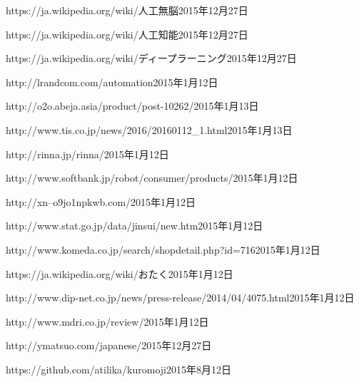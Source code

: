 \documentclass[a4paper,10pt,onecolumn,oneside,openany]{jsbook}
\begin{document}
\begin{thebibliography}{99}
	{https://ja.wikipedia.org/wiki/人工無脳}{2015年12月27日}

	{https://ja.wikipedia.org/wiki/人工知能}{2015年12月27日}

	{https://ja.wikipedia.org/wiki/ディープラーニング}{2015年12月27日}

	{http://lrandcom.com/automation}{2015年1月12日}

	{http://o2o.abeja.asia/product/post-10262/}{2015年1月13日}

	{http://www.tis.co.jp/news/2016/20160112_1.html}{2015年1月13日}

	{http://rinna.jp/rinna/}{2015年1月12日}

	{http://www.softbank.jp/robot/consumer/products/}{2015年1月12日}

	{http://xn--o9jo1npkwb.com/}{2015年1月12日}

	{http://www.stat.go.jp/data/jinsui/new.htm}{2015年1月12日}

	{http://www.komeda.co.jp/search/shopdetail.php?id=716}{2015年1月12日}

	{https://ja.wikipedia.org/wiki/おたく}{2015年1月12日}

	{http://www.dip-net.co.jp/news/press-release/2014/04/4075.html}{2015年1月12日}

	{http://www.mdri.co.jp/review/}{2015年1月12日}

	{http://ymatsuo.com/japanese/}{2015年12月27日}







	{https://github.com/atilika/kuromoji}{2015年8月12日}

\end{thebibliography}
\end{document}
